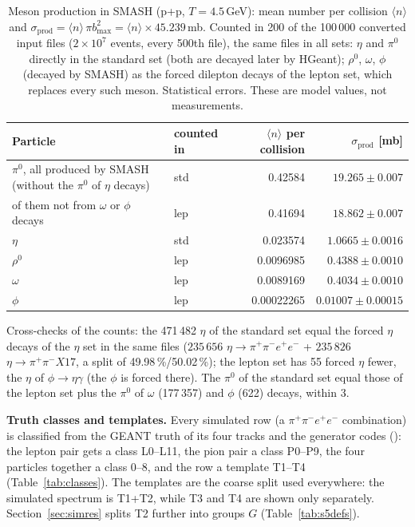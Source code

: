 \documentclass[11pt,a4paper]{article}
\newcommand{\piz}{\ensuremath{\pi^{0}}\xspace}
\newcommand{\pipi}{\ensuremath{\pi^{+}\pi^{-}}\xspace}
\newcommand{\ppee}{\ensuremath{\pi^{+}\pi^{-}e^{+}e^{-}}\xspace}
\newcommand{\code}[1]{\texttt{\detokenize{#1}}}
\begin{document}
\begin{table}[H]
\centering
\caption{Meson production in SMASH (p+p, $T = 4.5$\,GeV): mean number per collision
$\langle n\rangle$ and $\sigma_{\mathrm{prod}} = \langle n\rangle\,\pi b_{\max}^2 =
\langle n\rangle \times 45.239$\,mb. Counted in 200 of the 100\,000 converted input files
($2\times10^{7}$ events, every 500th file), the same files in all sets: $\eta$ and \piz directly in
the standard set (both are decayed later by HGeant); $\rho^0$, $\omega$, $\phi$ (decayed by SMASH)
as the forced dilepton decays of the lepton set, which replaces every such meson. Statistical
errors. These are model values, not measurements.}
\label{tab:smashprod}
\begin{tabularx}{\textwidth}{@{}L l r r@{}}
\toprule
Particle & counted in & $\langle n\rangle$ per collision & $\sigma_{\mathrm{prod}}$ [mb] \\
\midrule
\piz, all produced by SMASH (without the \piz of $\eta$ decays) & std & 0.42584 & $19.265\pm0.007$ \\
\quad of them not from $\omega$ or $\phi$ decays & lep & 0.41694 & $18.862\pm0.007$ \\
$\eta$ & std & 0.023574 & $1.0665\pm0.0016$ \\
$\rho^0$ & lep & 0.0096985 & $0.4388\pm0.0010$ \\
$\omega$ & lep & 0.0089169 & $0.4034\pm0.0010$ \\
$\phi$ & lep & 0.00022265 & $0.01007\pm0.00015$ \\
\bottomrule
\end{tabularx}
\end{table}

Cross-checks of the counts: the 471\,482 $\eta$ of the standard set equal the forced $\eta$ decays of
the $\eta$ set in the same files ($235\,656$ $\eta\to\ppee$ + $235\,826$ $\eta\to\pipi X17$, a split
of 49.98\,\%/50.02\,\%); the lepton set has 55 forced $\eta$ fewer, the $\eta$ of $\phi\to\eta\gamma$
(the $\phi$ is forced there). The \piz of the standard set equal those of the lepton set plus the
\piz of $\omega$ (177\,357) and $\phi$ (622) decays, within 3.

\textbf{Truth classes and templates.} Every simulated row (a \ppee combination) is classified
from the GEANT truth of its four tracks and the generator codes (\code{src/sim_truth.h}): the
lepton pair gets a class L0--L11, the pion pair a class P0--P9, the four particles together a
class 0--8, and the row a template T1--T4 (Table~\ref{tab:classes}). The templates are the
coarse split used everywhere: the simulated spectrum is T1+T2, while T3 and T4 are shown only
separately. Section~\ref{sec:simres} splits T2 further into groups $G$ (Table~\ref{tab:s5defs}).
\end{document}
